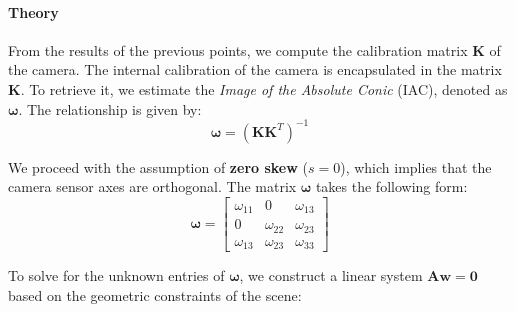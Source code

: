 \documentclass[a4paper,11pt]{article}
\newcommand{\matr}[1]{\bm{#1}}     %
\newcommand{\vect}[1]{\mathbf{#1}}  %
\begin{document}
\paragraph{Theory}
From the results of the previous points, we compute the calibration matrix $\mathbf{K}$ of the camera. The internal calibration of the camera is encapsulated in the matrix $\matr{K}$. To retrieve it, we estimate the \textit{Image of the Absolute Conic} (IAC), denoted as $\matr{\omega}$. The relationship is given by:
\begin{equation}
    \matr{\omega} = (\matr{K}\matr{K}^T)^{-1}
\end{equation}

We proceed with the assumption of \textbf{zero skew} ($s=0$), which implies that the camera sensor axes are orthogonal. The matrix $\matr{\omega}$ takes the following form:
\begin{equation}
    \matr{\omega} = 
    \begin{bmatrix}
    \omega_{11} & 0 & \omega_{13} \\
    0 & \omega_{22} & \omega_{23} \\
    \omega_{13} & \omega_{23} & \omega_{33}
    \end{bmatrix}
\end{equation}

To solve for the unknown entries of $\matr{\omega}$, we construct a linear system $\matr{A}\vect{w} = \vect{0}$ based on the geometric constraints of the scene:
\end{document}
